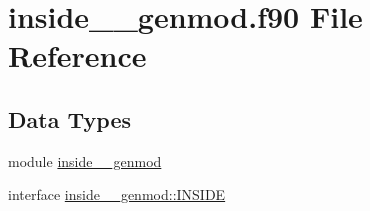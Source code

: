 \hypertarget{inside____genmod_8f90}{\section{inside\+\_\+\+\_\+genmod.\+f90 File Reference}
\label{inside____genmod_8f90}
}
\subsection*{Data Types}
\begin{DoxyCompactItemize}
\item 
module \hyperlink{classinside____genmod}{inside\+\_\+\+\_\+genmod}
\item 
interface \hyperlink{interfaceinside____genmod_1_1INSIDE}{inside\+\_\+\+\_\+genmod\+::\+I\+N\+S\+I\+D\+E}
\end{DoxyCompactItemize}
